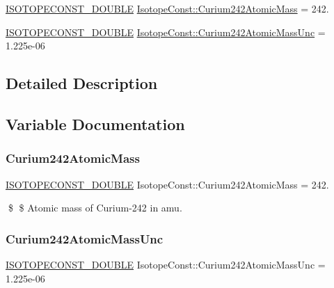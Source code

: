 \begin{DoxyCompactItemize}
\item 
\mbox{\hyperlink{group___isotope_const-_macros_ga8f45a7272ce02c0b4c65c44636ed719a}{I\+S\+O\+T\+O\+P\+E\+C\+O\+N\+S\+T\+\_\+\+D\+O\+U\+B\+LE}} \mbox{\hyperlink{group___isotope_const-_curium-_cm242_gab269961dc621bfbca851f2bd8c77bbfb}{Isotope\+Const\+::\+Curium242\+Atomic\+Mass}} = 242.
\item 
\mbox{\hyperlink{group___isotope_const-_macros_ga8f45a7272ce02c0b4c65c44636ed719a}{I\+S\+O\+T\+O\+P\+E\+C\+O\+N\+S\+T\+\_\+\+D\+O\+U\+B\+LE}} \mbox{\hyperlink{group___isotope_const-_curium-_cm242_gae8ce8a343c1656f94e9571aa372808ad}{Isotope\+Const\+::\+Curium242\+Atomic\+Mass\+Unc}} = 1.\+225e-\/06
\end{DoxyCompactItemize}


\subsection{Detailed Description}


\subsection{Variable Documentation}
\mbox{\label{group___isotope_const-_curium-_cm242_gab269961dc621bfbca851f2bd8c77bbfb}} 
\subsubsection{\texorpdfstring{Curium242\+Atomic\+Mass}{Curium242AtomicMass}}
{\footnotesize\ttfamily \mbox{\hyperlink{group___isotope_const-_macros_ga8f45a7272ce02c0b4c65c44636ed719a}{I\+S\+O\+T\+O\+P\+E\+C\+O\+N\+S\+T\+\_\+\+D\+O\+U\+B\+LE}} Isotope\+Const\+::\+Curium242\+Atomic\+Mass = 242.}

\$ \$ Atomic mass of Curium-\/242 in amu. \mbox{\label{group___isotope_const-_curium-_cm242_gae8ce8a343c1656f94e9571aa372808ad}} 
\subsubsection{\texorpdfstring{Curium242\+Atomic\+Mass\+Unc}{Curium242AtomicMassUnc}}
{\footnotesize\ttfamily \mbox{\hyperlink{group___isotope_const-_macros_ga8f45a7272ce02c0b4c65c44636ed719a}{I\+S\+O\+T\+O\+P\+E\+C\+O\+N\+S\+T\+\_\+\+D\+O\+U\+B\+LE}} Isotope\+Const\+::\+Curium242\+Atomic\+Mass\+Unc = 1.\+225e-\/06}

